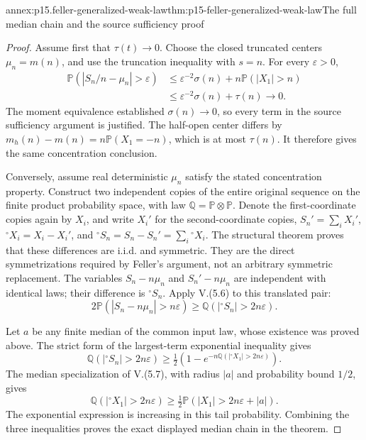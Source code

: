 \begin{annexitem}{annex:p15.feller-generalized-weak-law}{thm:p15-feller-generalized-weak-law}{The full median chain and the source sufficiency proof}
\begin{proof}
Assume first that \(\tau(t)\to0\). Choose the closed truncated
centers \(\mu_n=m(n)\), and use the truncation inequality with
\(s=n\). For every \(\varepsilon>0\),
\[
 \begin{aligned}
 \mathbb P(|S_n/n-\mu_n|>\varepsilon)
 &\leq\varepsilon^{-2}\sigma(n)+n\mathbb P(|X_1|>n)\\
 &\leq\varepsilon^{-2}\sigma(n)+\tau(n)\longrightarrow0.
 \end{aligned}
\]
The moment equivalence established \(\sigma(n)\to0\), so every
term in the source sufficiency argument is justified.
The half-open center differs by
\(m_h(n)-m(n)=n\mathbb P(X_1=-n)\), which is at most \(\tau(n)\).
It therefore gives the same concentration conclusion.

Conversely, assume real deterministic \(\mu_n\) satisfy the stated
concentration property. Construct two independent copies of the entire
original sequence on the finite product probability space, with law
\(\mathbb Q=\mathbb P\otimes\mathbb P\).
Denote the first-coordinate copies again by \(X_i\), and write
\(X_i'\) for the second-coordinate copies, \(S_n'=\sum_iX_i'\),
\({}^{\circ}X_i=X_i-X_i'\), and
\({}^{\circ}S_n=S_n-S_n'=\sum_i{}^{\circ}X_i\).
The structural theorem proves that these differences are i.i.d.
and symmetric. They are the direct symmetrizations required by
Feller's argument, not an arbitrary symmetric replacement.
The variables \(S_n-n\mu_n\) and \(S_n'-n\mu_n\) are independent
with identical laws; their difference is \({}^{\circ}S_n\).
Apply V.(5.6) to this translated pair:
\[
 2\mathbb P(|S_n-n\mu_n|>n\varepsilon)
       \geq\mathbb Q(|{}^{\circ}S_n|>2n\varepsilon).
\]

Let \(a\) be any finite median of the common input law, whose
existence was proved above. The strict form of the largest-term
exponential inequality gives
\[
 \mathbb Q(|{}^{\circ}S_n|>2n\varepsilon)
 \geq\tfrac12\left(1-
        e^{-n\mathbb Q(|{}^{\circ}X_1|>2n\varepsilon)}\right).
\]
The median specialization of V.(5.7), with radius \(|a|\) and
probability bound \(1/2\), gives
\[
 \mathbb Q(|{}^{\circ}X_1|>2n\varepsilon)
       \geq\tfrac12\mathbb P(|X_1|>2n\varepsilon+|a|).
\]
The exponential expression is increasing in this tail probability.
Combining the three inequalities proves the exact displayed
median chain in the theorem.


\end{proof}
\end{annexitem}
